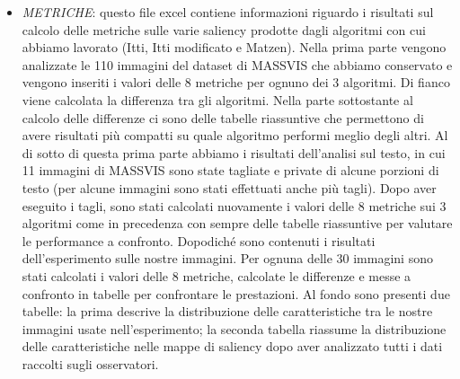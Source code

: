 \documentclass[%
	corpo=12pt,
    twoside,
    stile=classica,
    oldstyle,
    tipotesi=custom,
    greek,
    evenboxes,
]{toptesi}
\begin{document}
{\begin{itemize}
\begin{enumerate}
		\begin{enumerate}
		\item \textit{EyeTracking\_}: è l’immagine originale con sovrapposta la mappa di calore generata da tutti i punti di fissazione raccolti dagli osservatori;
		\item \textit{EyeTracking\_MOD250\_}: è l’immagine originale con sovrapposta la mappa di calore generata dai punti di fissazione raccolti dagli osservatori solo nei primi 250 ms;
		\item \textit{EyeTracking\_MOD500\_}: è l’immagine originale con sovrapposta la mappa di calore generata dai punti di fissazione raccolti dagli osservatori solo nei primi 500 ms;
		\item \textit{EyeTracking\_MODNOFIRST250\_}: è l’immagine originale con sovrapposta la mappa di calore generata dai punti di fissazione raccolti dagli osservatori escludendo i primi 250 ms e prendendo i 250 ms successivi a quelli esclusi;
		\end{enumerate}
	
	\end{enumerate}
\item \textit{METRICHE}: questo file excel contiene informazioni riguardo i risultati sul calcolo delle metriche sulle varie saliency prodotte dagli algoritmi con cui abbiamo lavorato (Itti, Itti modificato e Matzen). Nella prima parte vengono analizzate le 110 immagini del dataset di MASSVIS che abbiamo conservato e vengono inseriti i valori delle 8 metriche per ognuno dei 3 algoritmi. Di fianco viene calcolata la differenza tra gli algoritmi. Nella parte sottostante al calcolo delle differenze ci sono delle tabelle riassuntive che permettono di avere risultati più compatti su quale algoritmo performi meglio degli altri.
Al di sotto di questa prima parte abbiamo i risultati dell’analisi sul testo, in cui 11 immagini di MASSVIS sono state tagliate e private di alcune porzioni di testo (per alcune immagini sono stati effettuati anche più tagli). Dopo aver eseguito i tagli, sono stati calcolati nuovamente i valori delle 8 metriche sui 3 algoritmi come in precedenza con sempre delle tabelle riassuntive per valutare le performance a confronto.
Dopodiché sono contenuti i risultati dell’esperimento sulle nostre immagini. Per ognuna delle 30 immagini sono stati calcolati i valori delle 8 metriche, calcolate le differenze e messe a confronto in tabelle per confrontare le prestazioni. 
Al fondo sono presenti due tabelle: la prima descrive la distribuzione delle caratteristiche tra le nostre immagini usate nell’esperimento; la seconda tabella riassume la distribuzione delle caratteristiche nelle mappe di saliency dopo aver analizzato tutti i dati raccolti sugli osservatori.
\end{itemize}

}
\end{document}
